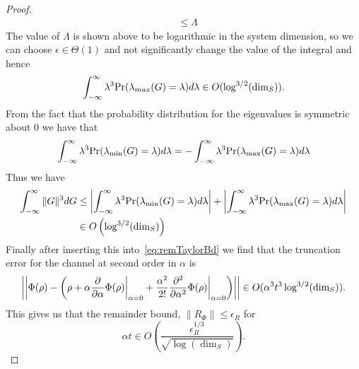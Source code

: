 \documentclass{article}
\newcommand{\norm}[1]{\left| \left| #1 \right| \right|}
\begin{document}
\begin{proof}
\begin{align}
    &\le \Lambda
\end{align}
The value of $\Lambda$ is shown above to be logarithmic in the system dimension, so we can choose $\epsilon \in \Theta(1)$ and not significantly change the value of the integral and hence
\begin{equation}
    \int_{-\infty}^\infty \lambda^3 {\rm Pr}(\lambda_{max}(G) = \lambda) d\lambda \in O(\log^{3/2}(\dim_S)).
\end{equation}
From the fact that the probability distribution for the eigenvalues is symmetric about $0$ we have that
\begin{equation}
    \int_{-\infty}^\infty \lambda^3 {\rm Pr}(\lambda_{\min}(G) = \lambda) d\lambda = - \int_{-\infty}^\infty \lambda^3 {\rm Pr}(\lambda_{\max}(G) = \lambda) d\lambda
\end{equation}
Thus we have 
\begin{align}
    \int_{-\infty}^\infty \|G\|^3 dG &\le \left|\int_{-\infty}^\infty \lambda^3 {\rm Pr}(\lambda_{\min}(G) = \lambda) d\lambda \right| + \left|\int_{-\infty}^\infty \lambda^3 {\rm Pr}(\lambda_{\max}(G) = \lambda) d\lambda \right|\nonumber\\
    &\in O\left(\log^{3/2}(\dim_S) \right)
\end{align}
Finally after inserting this into~\eqref{eq:remTaylorBd} we find that the truncation error for the channel at second order in $\alpha$ is
\begin{equation}
    \norm{\Phi(\rho) - \left(\rho + {\alpha} \frac{\partial}{\partial \alpha} \Phi(\rho) \bigg|_{\alpha = 0} + \frac{\alpha^2}{2!} \frac{\partial^2}{\partial \alpha^2} \Phi(\rho) \bigg|_{\alpha = 0} \right)} \in O(\alpha^3 t^3 \log^{3/2}({\rm dim}_S)).
\end{equation}
This gives us that the remainder bound, $\|R_\Phi\|\le \epsilon_R$ for 
\begin{equation}
    \alpha t \in O\left(\frac{\epsilon_R^{1/3}}{\sqrt{\log(\dim_S)}} \right).
\end{equation}
\end{proof}
\end{document}
